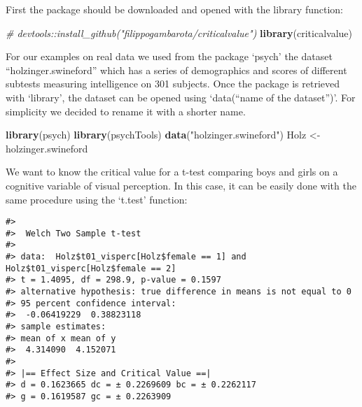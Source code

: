 \documentclass[
  man]{apa7}
\newenvironment{Shaded}{\begin{snugshade}}{\end{snugshade}}
\newcommand{\CommentTok}[1]{\textcolor[rgb]{0.56,0.35,0.01}{\textit{#1}}}
\newcommand{\DecValTok}[1]{\textcolor[rgb]{0.00,0.00,0.81}{#1}}
\newcommand{\FunctionTok}[1]{\textcolor[rgb]{0.13,0.29,0.53}{\textbf{#1}}}
\newcommand{\NormalTok}[1]{#1}
\newcommand{\OtherTok}[1]{\textcolor[rgb]{0.56,0.35,0.01}{#1}}
\newcommand{\SpecialCharTok}[1]{\textcolor[rgb]{0.81,0.36,0.00}{\textbf{#1}}}
\newcommand{\StringTok}[1]{\textcolor[rgb]{0.31,0.60,0.02}{#1}}
\begin{document}
First the package should be downloaded and opened with the library function:

\begin{Shaded}
\begin{Highlighting}[]
\CommentTok{\# devtools::install\_github("filippogambarota/criticalvalue")}
\FunctionTok{library}\NormalTok{(criticalvalue)}
\end{Highlighting}
\end{Shaded}

For our examples on real data we used from the package `psych' the dataset ``holzinger.swineford'' which has a series of demographics and scores of different subtests measuring intelligence on 301 subjects. Once the package is retrieved with `library', the dataset can be opened using `data(``name of the dataset'')'. For simplicity we decided to rename it with a shorter name.

\begin{Shaded}
\begin{Highlighting}[]
\FunctionTok{library}\NormalTok{(psych)}
\FunctionTok{library}\NormalTok{(psychTools)}
\FunctionTok{data}\NormalTok{(}\StringTok{"holzinger.swineford"}\NormalTok{)}
\NormalTok{Holz }\OtherTok{\textless{}{-}}\NormalTok{ holzinger.swineford}
\end{Highlighting}
\end{Shaded}

We want to know the critical value for a t-test comparing boys and girls on a cognitive variable of visual perception. In this case, it can be easily done with the same procedure using the `t.test' function:

\begin{Shaded}
\end{Shaded}

\begin{verbatim}
#> 
#>  Welch Two Sample t-test
#> 
#> data:  Holz$t01_visperc[Holz$female == 1] and Holz$t01_visperc[Holz$female == 2]
#> t = 1.4095, df = 298.9, p-value = 0.1597
#> alternative hypothesis: true difference in means is not equal to 0
#> 95 percent confidence interval:
#>  -0.06419229  0.38823118
#> sample estimates:
#> mean of x mean of y 
#>  4.314090  4.152071 
#> 
#> |== Effect Size and Critical Value ==| 
#> d = 0.1623665 dc = ± 0.2269609 bc = ± 0.2262117 
#> g = 0.1619587 gc = ± 0.2263909
\end{verbatim}
\end{document}
